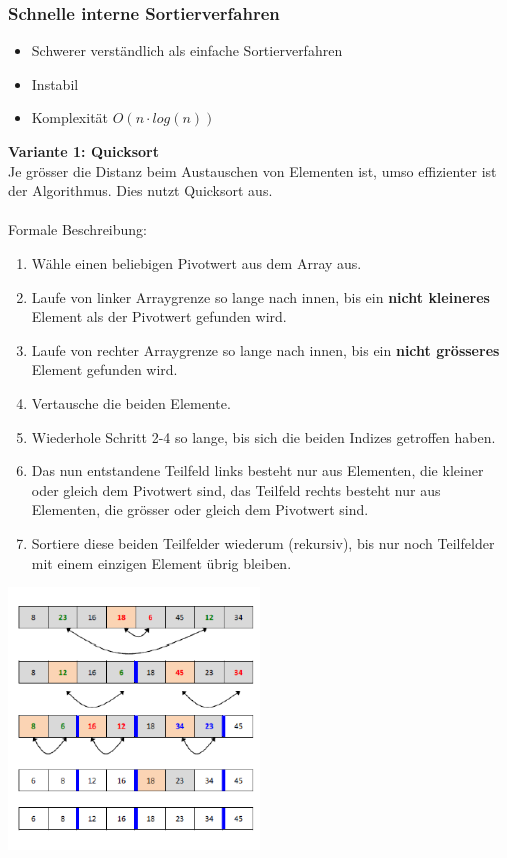 \subsubsection{Schnelle interne Sortierverfahren}
\begin{itemize}
    \item Schwerer verständlich als einfache Sortierverfahren
    \item Instabil
    \item Komplexität $O(n\cdot log(n))$
\end{itemize}
\textbf{Variante 1: Quicksort}\\
Je grösser die Distanz beim Austauschen von Elementen ist, umso effizienter ist der Algorithmus. Dies nutzt Quicksort aus.\\\\
Formale Beschreibung:
\begin{enumerate}
\item Wähle einen beliebigen Pivotwert aus dem Array aus.
\item Laufe von linker Arraygrenze so lange nach innen, bis ein \textbf{nicht kleineres}
Element als der Pivotwert gefunden wird. 
\item Laufe von rechter Arraygrenze so lange nach innen, bis ein \textbf{nicht grösseres} Element gefunden wird.
\item Vertausche die beiden Elemente.
\item Wiederhole Schritt 2-4 so lange, bis sich die beiden Indizes getroffen haben.
\item Das nun entstandene Teilfeld links besteht nur aus Elementen, die kleiner oder gleich dem Pivotwert sind, das Teilfeld rechts besteht nur aus Elementen, die grösser oder gleich dem Pivotwert sind. 
\item Sortiere diese beiden Teilfelder wiederum (rekursiv), bis nur noch Teilfelder mit einem einzigen Element übrig bleiben.
\end{enumerate}
\begin{multicols}{2}

\includegraphics[width=0.5\textwidth]{images/Algorithmen/Quicksort.png} \ \\ \ \\
\end{multicols}
